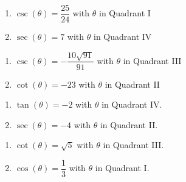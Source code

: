 \begin{multicols}{2}

\begin{enumerate}

\setcounter{enumi}{\value{HW}}

\item $\csc(\theta) = \dfrac{25}{24}$ with $\theta$ in Quadrant I
\item $\sec(\theta) = 7$ with $\theta$ in Quadrant IV 

\setcounter{HW}{\value{enumi}}

\end{enumerate}

\end{multicols}

\begin{multicols}{2}

\begin{enumerate}

\setcounter{enumi}{\value{HW}}

\item $\csc(\theta) = -\dfrac{10\sqrt{91}}{91}$ with $\theta$ in Quadrant III
\item $\cot(\theta) = -23$ with $\theta$ in Quadrant II 

\setcounter{HW}{\value{enumi}}

\end{enumerate}

\end{multicols}

\begin{multicols}{2}

\begin{enumerate}

\setcounter{enumi}{\value{HW}}

\item  $\tan(\theta) = -2$ with $\theta$ in Quadrant IV.
\item  $\sec(\theta) = -4$ with $\theta$ in Quadrant II.

\setcounter{HW}{\value{enumi}}

\end{enumerate}

\end{multicols}

\begin{multicols}{2}

\begin{enumerate}

\setcounter{enumi}{\value{HW}}

\item $\cot(\theta) = \sqrt{5}$ with $\theta$ in Quadrant III. 
\item  $\cos(\theta) = \dfrac{1}{3}$ with $\theta$ in Quadrant I.

\setcounter{HW}{\value{enumi}}

\end{enumerate}

\end{multicols}

